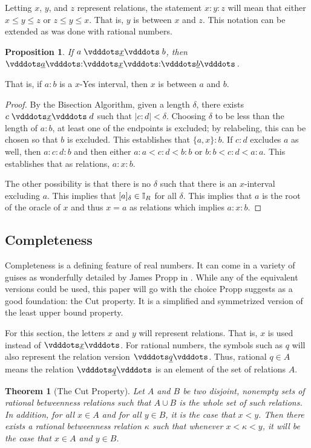 \documentclass[12pt]{article}
\newtheorem{theorem}{Theorem}[section]
\newtheorem{proposition}{Proposition}[section]
\begin{document}
Letting $x$, $y$, and $z$ represent relations, the statement $x:y:z$ will mean that either $x \leq y \leq z$ or $z \leq y \leq x$. That is, $y$ is between $x$ and $z$. This notation can be extended as was done with rational numbers. 

\begin{proposition}
    If $a \xrel b$, then $\xrel[a] : \xrel : \xrel[b]$.
\end{proposition}

That is, if $a:b$ is a $x$-Yes interval, then $x$ is between $a$ and $b$.

\begin{proof}
    By the Bisection Algorithm, given a length $\delta$, there exists $c \xrel d$ such that $|c:d|<\delta$. Choosing $\delta$ to be less than the length of $a:b$, at least one of the endpoints is excluded; by relabeling, this can be chosen so that $b$ is excluded. This establishes that $\{a, x\} : b$. If $c:d$ excludes $a$ as well, then $a : c:d:b$ and then either $a:a < c:d < b:b$ or $b:b < c:d < a:a$. This establishes that as relations, $a : x : b$. 

    The other possibility is that there is no $\delta$ such that there is an $x$-interval excluding $a$. This implies that $[a]_{\delta} \in \mathbb{I}_R$ for all $\delta$. This implies that $a$ is the root of the oracle of $x$ and thus $x = a$ as relations which implies $a:x:b$. 
\end{proof}


\subsection{Completeness}

Completeness is a defining feature of real numbers. It can come in a variety of guises as wonderfully detailed by James Propp in \cite{propp}. While any of the equivalent versions could be used, this paper will go with the choice Propp suggests as a good foundation: the Cut property. It is a simplified and symmetrized version of the least upper bound property. 

For this section, the letters $x$ and $y$ will represent relations. That is, $x$ is used instead of $\xrel$. For rational numbers, the symbols such as $q$ will also represent the relation version $\xrel[q]$. Thus, rational $q \in A$ means the relation $\xrel[q]$ is an element of the set of relations $A$. 

\begin{theorem}[The Cut Property] 
Let $A$ and $B$ be two disjoint, nonempty sets of rational betweenness relations such that $A \cup B$ is the whole set of such relations. In addition, for all $x \in A$ and for all $y \in B$, it is the case that $x < y$. Then there exists a rational betweenness relation $\kappa$ such that whenever $x < \kappa < y$, it will be the case that $ x \in A$ and $y \in B$.
\end{theorem}
\end{document}
